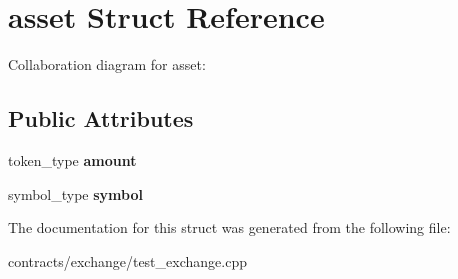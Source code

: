 \hypertarget{structasset}{}\section{asset Struct Reference}
\label{structasset}


Collaboration diagram for asset\+:
\subsection*{Public Attributes}
\begin{DoxyCompactItemize}
\item 
\mbox{\label{structasset_a5d9d6bfb7dc6b4c29b81279967d7d4d6}} 
token\+\_\+type {\bfseries amount}
\item 
\mbox{\label{structasset_a2e7127e77c0c52008a58a185009e67f9}} 
symbol\+\_\+type {\bfseries symbol}
\end{DoxyCompactItemize}


The documentation for this struct was generated from the following file\+:\begin{DoxyCompactItemize}
\item 
contracts/exchange/test\+\_\+exchange.\+cpp\end{DoxyCompactItemize}
